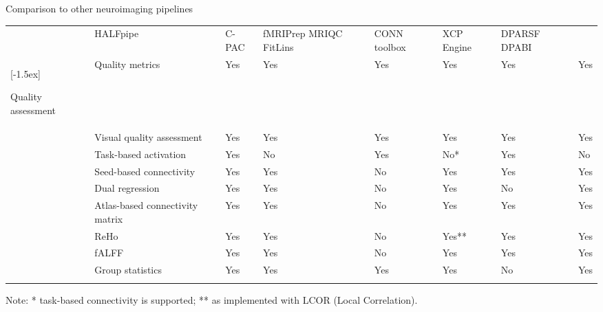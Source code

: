 \begin{tablebox}[label={table:comparison}]{Comparison to other neuroimaging pipelines}

{\tabulinesep=1.2mm
\begin{tabu} to \textwidth {| X[l,m] | X[l,m] |
X[c,m] | X[c,m] | X[c,m] | X[c,m] | X[c,m] | X[c,m] |}
\rowfont\bfseries
{} & HALFpipe & C-PAC & fMRIPrep MRIQC FitLins & CONN toolbox & XCP Engine & DPARSF DPABI \\
[-1.5ex]{\parbox[c][][c]{2cm}{\raggedright{Quality assessment}}} & Quality metrics & Yes & Yes & Yes & Yes & Yes & Yes \\
& Visual quality assessment & Yes & Yes & Yes & Yes & Yes & Yes \\
 & Task-based activation & Yes & No & Yes & No* & Yes & No \\
& Seed-based connectivity & Yes & Yes & No & Yes & Yes & Yes \\
& Dual regression & Yes & Yes & No & Yes & No & Yes \\
& Atlas-based connectivity matrix & Yes & Yes & No & Yes & Yes & Yes \\
& ReHo & Yes & Yes & No & Yes** & Yes & Yes \\
& fALFF & Yes & Yes & No & Yes & Yes & Yes \\
& Group statistics & Yes & Yes & Yes & Yes & No & Yes \\
\end{tabu}}\par
\vspace*{2mm}
Note: * task-based connectivity is supported; ** as implemented with LCOR (Local Correlation).

\end{tablebox}

